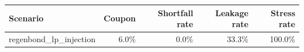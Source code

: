 \begingroup
\small
\setlength{\tabcolsep}{3pt}
\begin{tabular}{lrrrr}
\toprule
Scenario & Coupon & Shortfall rate & Leakage rate & Stress rate \\
\midrule
regenbond\_lp\_injection & 6.0\% & 0.0\% & 33.3\% & 100.0\% \\
\bottomrule
\end{tabular}
\endgroup
